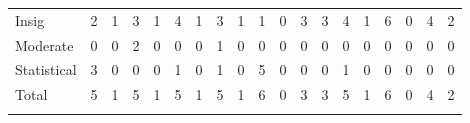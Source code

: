 \begin{tabular}{lcccccccccccccccccc}
\hline \noalign{\smallskip}Insig & 2 & 1 & 3 & 1 & 4 & 1 & 3 & 1 & 1 & 0 & 3 & 3 & 4 & 1 & 6 & 0 & 4 & 2\\
Moderate & 0 & 0 & 2 & 0 & 0 & 0 & 1 & 0 & 0 & 0 & 0 & 0 & 0 & 0 & 0 & 0 & 0 & 0\\
Statistical & 3 & 0 & 0 & 0 & 1 & 0 & 1 & 0 & 5 & 0 & 0 & 0 & 1 & 0 & 0 & 0 & 0 & 0\\
Total & 5 & 1 & 5 & 1 & 5 & 1 & 5 & 1 & 6 & 0 & 3 & 3 & 5 & 1 & 6 & 0 & 4 & 2\\
\noalign{\smallskip}\hline\end{tabular}\\
